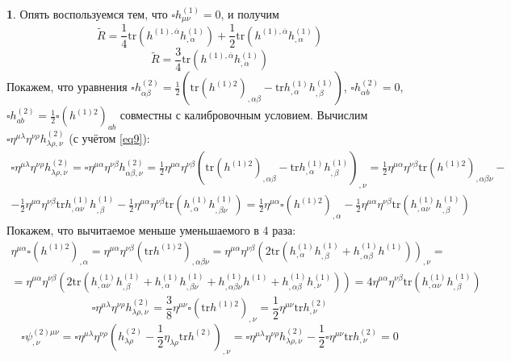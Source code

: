 \documentclass[12pt]{article}
\theoremstyle{definition}
\newtheorem{zad}{}[section]
\begin{document}
\begin{zad}
Опять воспользуемся тем, что $\square h^{(1)}_{\mu\nu}=0$, и получим
\begin{equation}
    \tilde R=\frac{1}{4}\text{tr}(h^{(1),\overline{\alpha}}h^{(1)}_{,\alpha})+\frac{1}{2}\text{tr}(h^{(1),\overline{\alpha}}h^{(1)}_{,\alpha})
\end{equation}
\begin{equation}
    \boxed{\tilde R=\frac{3}{4}\text{tr}(h^{(1),\overline{\alpha}}h^{(1)}_{,\alpha})}
\end{equation}
Покажем, что уравнения $\square h^{(2)}_{\alpha\beta}=\frac{1}{2}\left(\text{tr}(h^{(1)2})_{,\alpha\beta}-\text{tr}h^{(1)}_{,\alpha}h^{(1)}_{,\beta}\right)$, $\square h^{(2)}_{\alpha b}=0$, $\square h^{(2)}_{ab}=\frac{1}{2}\square(h^{(1)2})_{ab}$ совместны с калибровочным условием. Вычислим $\square\eta^{\mu\lambda}\eta^{\nu\rho}h^{(2)}_{\lambda\rho,\nu}$ (с учётом \ref{eq9}): 
\begin{multline}
    \square\eta^{\mu\lambda}\eta^{\nu\rho}h^{(2)}_{\lambda\rho,\nu}=\square\eta^{\mu\alpha}\eta^{\nu\beta}h^{(2)}_{\alpha\beta,\nu}=\frac{1}{2}\eta^{\mu\alpha}\eta^{\nu\beta}(\text{tr}(h^{(1)2})_{,\alpha\beta}-\text{tr}h^{(1)}_{,\alpha}h^{(1)}_{,\beta})_{,\nu}=\frac{1}{2}\eta^{\mu\alpha}\eta^{\nu\beta}\text{tr}(h^{(1)2})_{,\alpha\beta\nu}-\\-\frac{1}{2}\eta^{\mu\alpha}\eta^{\nu\beta}\text{tr}h^{(1)}_{,\alpha\nu}h^{(1)}_{,\beta}-\frac{1}{2}\eta^{\mu\alpha}\eta^{\nu\beta}\text{tr}(h^{(1)}_{,\alpha}h^{(1)}_{,\beta\nu})=\frac{1}{2}\eta^{\mu\alpha}\square(h^{(1)2})_{,\alpha}-\frac{1}{2}\eta^{\mu\alpha}\eta^{\nu\beta}\text{tr}(h^{(1)}_{,\alpha\nu}h^{(1)}_{,\beta})
\end{multline}
Покажем, что вычитаемое меньше уменьшаемого в 4 раза:
\begin{multline}
    \eta^{\mu\alpha}\square(h^{(1)2})_{,\alpha}=\eta^{\mu\alpha}\eta^{\nu\beta}(\text{tr}h^{(1)2})_{,\alpha\beta\nu}=\eta^{\mu\alpha}\eta^{\nu\beta}(2\text{tr}(h^{(1)}_{,\alpha}h^{(1)}_{,\beta}+h^{(1)}_{,\alpha\beta}h^{(1)}))_{,\nu}=\\=\eta^{\mu\alpha}\eta^{\nu\beta}(2\text{tr}(h^{(1)}_{,\alpha\nu}h^{(1)}_{,\beta}+h^{(1)}_{,\alpha}h^{(1)}_{,\beta\nu}+h^{(1)}_{,\alpha\beta\nu}h^{(1)}+h^{(1)}_{,\alpha\beta}h^{(1)}_{,\nu}))=4\eta^{\mu\alpha}\eta^{\nu\beta}\text{tr}(h^{(1)}_{,\alpha\nu}h^{(1)}_{,\beta})
\end{multline}
\begin{equation}
    \square\eta^{\mu\lambda}\eta^{\nu\rho}h^{(2)}_{\lambda\rho,\nu}=\frac{3}{8}\eta^{\mu\nu}\square(\text{tr}h^{(1)2})_{,\nu}=\frac{1}{2}\eta^{\mu\nu}\text{tr}h^{(2)}_{,\nu}
\end{equation}
\begin{equation}
    \square\psi^{(2)\mu\nu}_{,\nu}=\square\eta^{\mu\lambda}\eta^{\nu\rho}(h^{(2)}_{\lambda\rho}-\frac{1}{2}\eta_{\lambda\rho}\text{tr}h^{(2)})_{,\nu}=\square\eta^{\mu\lambda}\eta^{\nu\rho}h^{(2)}_{\lambda\rho,\nu}-\frac{1}{2}\square\eta^{\mu\nu}\text{tr}h^{(2)}_{,\nu}=0
\end{equation}
\end{zad}
\end{document}
